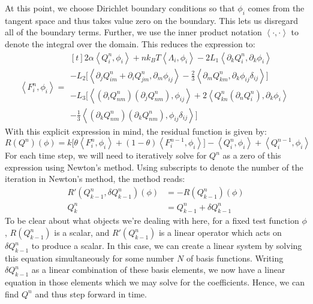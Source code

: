 \documentclass[reqno]{article}
\begin{document}
	At this point, we choose Dirichlet boundary conditions so that $\phi_i$ comes from the tangent space and thus takes value zero on the boundary.
	This lets us disregard all of the boundary terms.
	Further, we use the inner product notation $\left< \cdot, \cdot \right>$ to denote the integral over the domain.
	This reduces the expression to:
	\begin{equation}
		\left< F^n_i, \phi_i \right>
		=
		\begin{multlined}[t]
			2 \alpha \left< Q^n_i, \phi_i \right>
			+ n k_B T \left< \Lambda_i, \phi_i \right>
			- 2 L_1 \left< \partial_k Q^n_i, \partial_k \phi_i \right> \\
			- L_2 \biggl[
			\left< \partial_j Q^n_{im} + \partial_i Q^n_{jm}, \partial_m \phi_{ij} \right>
			- \tfrac23 \left< \partial_m Q^n_{km}, \partial_k \phi_{ij} \delta_{ij} \right>
			\biggr] \\
			- L_3 \biggl[
			\left< (\partial_i Q^n_{nm}) (\partial_j Q^n_{nm}), \phi_{ij} \right>
			+ 2 \left< Q^n_{kn} (\partial_n Q^n_i), \partial_k \phi_i \right> \\
			- \tfrac13 \left< (\partial_k Q^n_{nm})(\partial_k Q^n_{nm}), \phi_{ij} \delta_{ij} \right>
			\biggr]
		\end{multlined}
	\end{equation}
	With this explicit expression in mind, the residual function is given by:
	\begin{equation}
		R(Q^n) (\phi) =
		k \biggl[
		\theta \left< F^n_i, \phi_i \right> 
		+ (1 - \theta) \left< F^{n - 1}_i, \phi_i \right>
		\biggr]
		- \left< Q^n_i, \phi_i \right>
		+ \left< Q^{n - 1}_i, \phi_i \right>
	\end{equation}
	For each time step, we will need to iteratively solve for $Q^n$ as a zero of this expression using Newton's method.
	Using subscripts to denote the number of the iteration in Newton's method, the method reads:
	\begin{align}
		R'(Q^n_{k - 1}, \delta Q^n_{k - 1}) (\phi)
		&= - R(Q^n_{k - 1}) (\phi) \\
		Q^n_k
		&= Q^n_{k - 1} + \delta Q^n_{k - 1}
	\end{align}
	To be clear about what objects we're dealing with here, for a fixed test function $\phi$, $R(Q^n_{k - 1})$ is a scalar, and $R'(Q^n_{k - 1})$ is a linear operator which acts on $\delta Q^n_{k - 1}$ to produce a scalar.
	In this case, we can create a linear system by solving this equation simultaneously for some number $N$ of basis functions.
	Writing $\delta Q^n_{k - 1}$ as a linear combination of these basis elements, we now have a linear equation in those elements which we may solve for the coefficients.
	Hence, we can find $Q^n$ and thus step forward in time.
	
\end{document}
